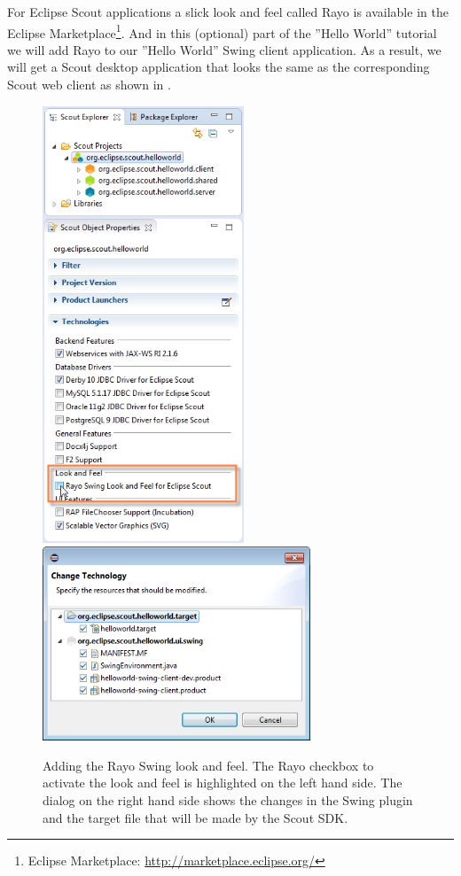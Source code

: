 \documentclass[a4paper,10pt,twoside]{book}
\begin{document}
For Eclipse Scout applications a slick look and feel called Rayo is available in the Eclipse Marketplace\footnote{
Eclipse Marketplace: \url{http://marketplace.eclipse.org/}
}.
And in this (optional) part of the ''Hello World'' tutorial we will add Rayo to our ''Hello World'' Swing client application.
As a result, we will get a Scout desktop application that looks the same as the corresponding Scout web client as shown in .

\begin{figure}
\includegraphics[width=6cm]{sdk_rayo_add_checkbox.png} \hspace{5mm}
\includegraphics[width=8cm]{sdk_rayo_confirm_changes.png}
\caption{Adding the Rayo Swing look and feel. The Rayo checkbox to activate the look and feel is highlighted on the left hand side. The dialog on the right hand side shows the changes in the Swing plugin and the target file that will be made by the Scout SDK.}
\end{figure}
\end{document}

